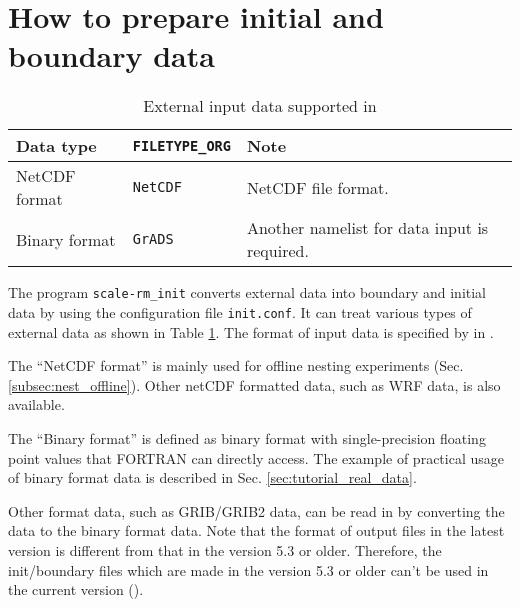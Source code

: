 \section{How to prepare initial and boundary data} \label{sec:adv_datainput}

\begin{table}[tbh]
\begin{center}
\caption{External input data supported in \scalelib}
\begin{tabularx}{150mm}{l|l|X} \hline
 \rowcolor[gray]{0.9} Data type   & \verb|FILETYPE_ORG|  & Note \\ \hline
 NetCDF format   & \verb|NetCDF|     & NetCDF file format. \\ \hline
 Binary format  & \verb|GrADS|      & Another namelist for data input is required.    \\ \hline
\end{tabularx}
\label{tab:inputdata_format}
\end{center}
\end{table}

The program \verb|scale-rm_init| converts external data into boundary and initial data by using the configuration file \verb|init.conf|.
It can treat various types of external data as shown in Table \ref{tab:inputdata_format}.
The format of input data is specified by  in .

The ``NetCDF format'' is mainly used for offline nesting experiments (Sec. \ref{subsec:nest_offline}).
Other netCDF formatted data, such as WRF data, is also available.

The ``Binary format'' is defined as binary format with single-precision floating point values that FORTRAN can directly access.
The example of practical usage of binary format data is described in Sec. \ref{sec:tutorial_real_data}.

Other format data, such as GRIB/GRIB2 data, can be read in \scale by converting the data to the binary format data.
Note that the format of output files in the latest version is different from that in the version 5.3 or older.
Therefore, the init/boundary files which are made in the version 5.3 or older can't be used in the current version (\scalelib \version).


